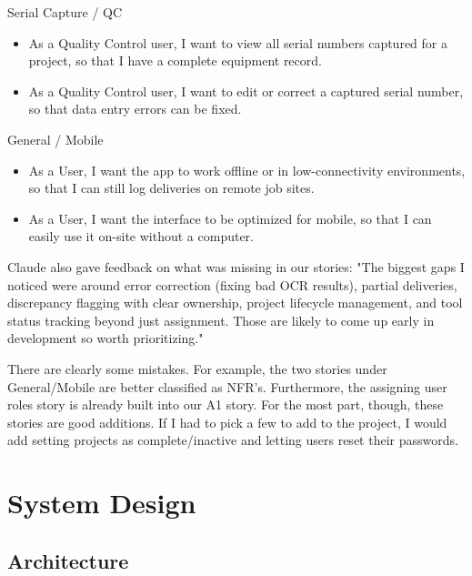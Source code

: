 \documentclass{article}
\begin{document}
Serial Capture / QC
\begin{itemize}
    \item As a Quality Control user, I want to view all serial numbers captured for a project, so that I have a complete equipment record.
    \item As a Quality Control user, I want to edit or correct a captured serial number, so that data entry errors can be fixed.
\end{itemize}
 
General / Mobile
\begin{itemize}
    \item As a User, I want the app to work offline or in low-connectivity environments, so that I can still log deliveries on remote job sites.
    \item As a User, I want the interface to be optimized for mobile, so that I can easily use it on-site without a computer.
\end{itemize}
 
Claude also gave feedback on what was missing in our stories: 
"The biggest gaps I noticed were around error correction (fixing bad OCR results), partial deliveries, discrepancy flagging with clear ownership, project lifecycle management, and tool status tracking beyond just assignment. Those are likely to come up early in development so worth prioritizing."

There are clearly some mistakes. For example, the two stories under General/Mobile are better classified as NFR's. Furthermore, the assigning user roles story is already built into our A1 story. For the most part, though, these stories are good additions. If I had to pick a few to add to the project, I would add setting projects as complete/inactive and letting users reset their passwords. 

\section{System Design}

\subsection{Architecture}
\end{document}
